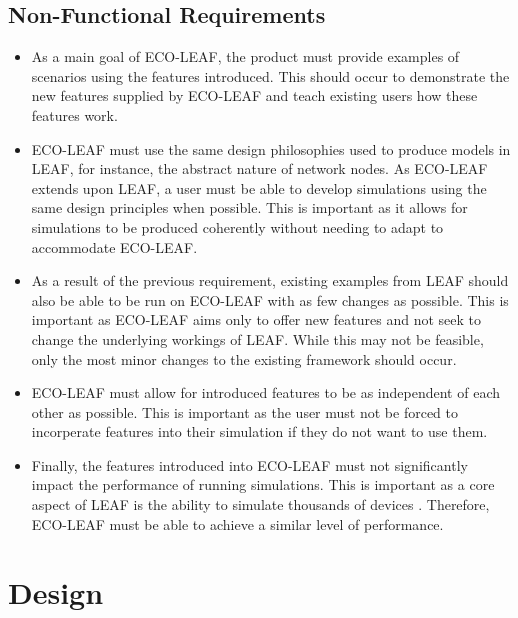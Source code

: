 \documentclass{l4proj}
\begin{document}
\section{Non-Functional Requirements}
\begin{itemize}
    \item As a main goal of ECO-LEAF, the product must provide examples of scenarios using the features introduced. This should occur to demonstrate the new features supplied by ECO-LEAF and teach existing users how these features work.
    \item ECO-LEAF must use the same design philosophies used to produce models in LEAF, for instance, the abstract nature of network nodes. As ECO-LEAF extends upon LEAF, a user must be able to develop simulations using the same design principles when possible. This is important as it allows for simulations to be produced coherently without needing to adapt to accommodate ECO-LEAF.
    \item As a result of the previous requirement, existing examples from LEAF should also be able to be run on ECO-LEAF with as few changes as possible. This is important as ECO-LEAF aims only to offer new features and not seek to change the underlying workings of LEAF. While this may not be feasible, only the most minor changes to the existing framework should occur.
    \item ECO-LEAF must allow for introduced features to be as independent of each other as possible. This is important as the user must not be forced to incorperate features into their simulation if they do not want to use them.
    \item Finally, the features introduced into ECO-LEAF must not significantly impact the performance of running simulations. This is important as a core aspect of LEAF is the ability to simulate thousands of devices \citep{leaf2021}. Therefore, ECO-LEAF must be able to achieve a similar level of performance.
\end{itemize}
\chapter{Design}\label{ch:design}


\end{document}
